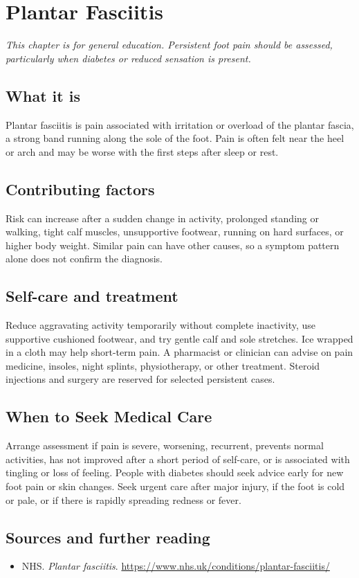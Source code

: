 \chapter{Plantar Fasciitis}

\medskip
\noindent\textit{This chapter is for general education. Persistent foot pain should be assessed, particularly when diabetes or reduced sensation is present.}

\section*{What it is}
Plantar fasciitis is pain associated with irritation or overload of the plantar fascia, a strong band running along the sole of the foot. Pain is often felt near the heel or arch and may be worse with the first steps after sleep or rest.

\section*{Contributing factors}
Risk can increase after a sudden change in activity, prolonged standing or walking, tight calf muscles, unsupportive footwear, running on hard surfaces, or higher body weight. Similar pain can have other causes, so a symptom pattern alone does not confirm the diagnosis.

\section*{Self-care and treatment}
Reduce aggravating activity temporarily without complete inactivity, use supportive cushioned footwear, and try gentle calf and sole stretches. Ice wrapped in a cloth may help short-term pain. A pharmacist or clinician can advise on pain medicine, insoles, night splints, physiotherapy, or other treatment. Steroid injections and surgery are reserved for selected persistent cases.

\section*{When to Seek Medical Care}
Arrange assessment if pain is severe, worsening, recurrent, prevents normal activities, has not improved after a short period of self-care, or is associated with tingling or loss of feeling. People with diabetes should seek advice early for new foot pain or skin changes. Seek urgent care after major injury, if the foot is cold or pale, or if there is rapidly spreading redness or fever.

\section*{Sources and further reading}
\begin{itemize}
\item NHS. \textit{Plantar fasciitis}. \url{https://www.nhs.uk/conditions/plantar-fasciitis/}
\end{itemize}
